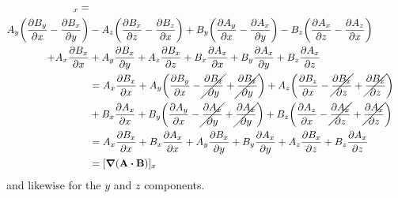 \documentclass[../main.tex]{subfiles}
\begin{document}
\begin{align*}
    [\vb{A} \cp (\curl{\vb{B}}) + \vb{B} \cp (\curl{\vb{A}}) &+ (\vb{A} \vdot \grad) \vb{B}
        + (\vb{B} \vdot \grad) \vb{A}]_x = \\
        A_y \qt(\pdv{B_y}{x} - \pdv{B_x}{y})
    &- A_z \qt(\pdv{B_x}{z} - \pdv{B_z}{x}) 
        + B_y \qt(\pdv{A_y}{x} - \pdv{A_x}{y})
        - B_z \qt(\pdv{A_x}{z} - \pdv{A_z}{x}) \\
        + A_x \pdv{B_x}{x}
    &+ A_y \pdv{B_x}{y} + A_z \pdv{B_x}{z}
        + B_x \pdv{A_x}{x} + B_y \pdv{A_x}{y} + B_z \pdv{A_x}{z} \\
    &= A_x \pdv{B_x}{x} + A_y \qt(\pdv{B_y}{x} -
            \cancel{\pdv{B_x}{y}} + \cancel{\pdv{B_x}{y}})
        + A_z \qt(\pdv{B_z}{x} - 
            \cancel{\pdv{B_x}{z}} + \cancel{\pdv{B_x}{z}} ) \\
    &+ B_x \pdv{A_x}{x} + B_y \qt(\pdv{A_y}{x} - 
            \cancel{\pdv{A_x}{y}} + \cancel{\pdv{A_x}{y}})
        + B_z \qt(\pdv{A_z}{x} - 
            \cancel{\pdv{A_x}{z}} + \cancel{\pdv{A_x}{z}}) \\
    &= A_x \pdv{B_x}{x} + B_x \pdv{A_x}{x} + A_y \pdv{B_x}{y} + B_y \pdv{A_x}{y}
        + A_z \pdv{B_x}{z} + B_z \pdv{A_x}{z} \\
    &= [\grad(\vb{A} \vdot \vb{B})]_x
\end{align*}
and likewise for the $y$ and $z$ components. 
\end{document}
